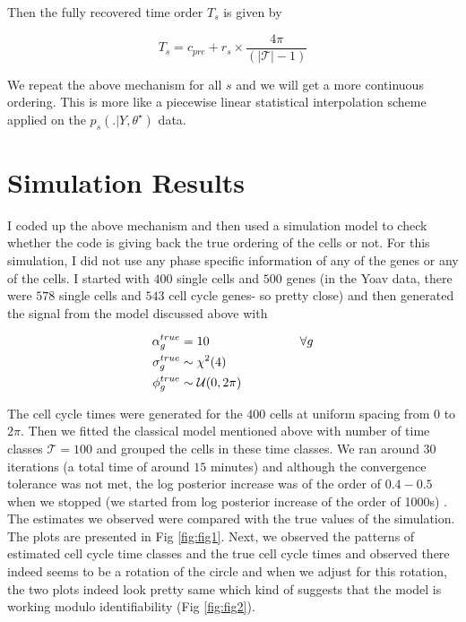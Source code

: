 \documentclass[11pt]{article}
\begin{document}
Then the fully recovered time order $T_s$ is given by 

$$ T_s = c_{pre} + r_s \times  \frac{4 \pi}{(| \mathcal{T} | -1 )} $$

We repeat the above mechanism for all $s$ and we will get a more continuous ordering. This is more like a piecewise linear statistical interpolation scheme applied on the $p_s \left (. | Y, \theta^{\star} \right )$ data. 


\section{Simulation Results}

I coded up the above mechanism and then used a simulation model to check whether the code is giving back the true ordering of the cells or not. For this simulation, I did not use any phase specific information of any of the genes or any of the cells. I started with $400$ single cells and $500$ genes (in the Yoav data, there were $578$ single cells and $543$ cell cycle genes- so pretty close) and then generated the signal from the model discussed above with 

\begin{align*}
 \alpha^{true}_{g}  & =10 \hspace{1 in} \forall g  \\
 \sigma^{true}_{g} &  \sim \chi^{2} (4)  \\
 \phi^{true}_{g}  & \sim \mathcal{U}(0, 2 \pi)   \\
 \end{align*}
 

The cell cycle times were generated for the $400$ cells at uniform spacing from $0$ to $2 \pi$. Then we fitted the classical model mentioned above with number of time classes $\mathcal{T} =100$ and grouped the cells in these time classes. We ran around $30$ iterations (a total time of around $15$ minutes) and although the convergence tolerance was not met, the log posterior increase was of the order of $0.4-0.5$ when we stopped (we started from log posterior increase of the order of 1000s) . The estimates we observed were compared with the true values of the simulation. The plots are presented in Fig \ref{fig:fig1}. Next, we observed the patterns of estimated cell cycle time classes and the true cell cycle times and observed there indeed seems to be a rotation of the circle and when we adjust for this rotation, the two plots indeed look pretty same which kind of suggests that the model is working modulo identifiability (Fig \ref{fig:fig2}).
\end{document}
